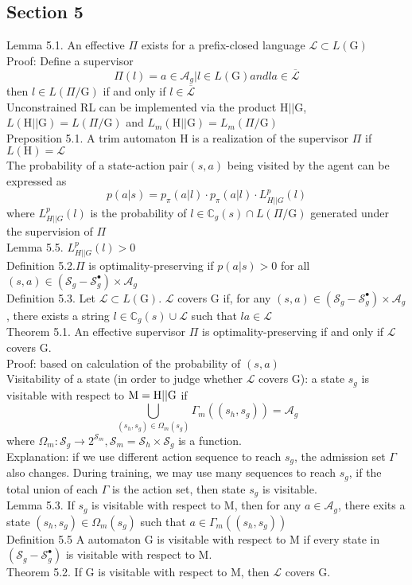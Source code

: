 \documentclass{article}
\begin{document}
\subsection{Section 5}
Lemma 5.1. An effective $\Pi$ exists for a prefix-closed language $\mathcal{L}\subset L(\mathrm{G})$\\
Proof:
Define a supervisor 
$$\Pi(l)=a\in\mathcal{A}_g|l\in L(\mathrm{G}) {and} la\in\overline{\mathcal{L}}$$
then $l\in L(\Pi/\mathrm{G})$ if and only if $l\in\overline{\mathcal{L}}$\\
Unconstrained RL can be implemented via the product $\mathrm{H}||\mathrm{G}$, $L(\mathrm{H}||\mathrm{G})=L(\Pi/\mathrm{G})$ and $L_m(\mathrm{H}||\mathrm{G})=L_m(\Pi/\mathrm{G})$ \\
Preposition 5.1. A trim automaton H is a realization of the supervisor $\Pi$ if $L(\mathrm{H}) = \mathcal{L}$\\
The probability of a state-action pair$(s,a)$ being visited by the agent can be expressed as
$$
p(a|s)=p_{\pi}(a|l)\cdot p_{\pi}(a|l)\cdot L_{{H||G}}^{p}(l)
$$
where $L_{{H||G}}^{p}(l)$ is the probability of $l\in\mathbb{C}_g(s)\cap L(\Pi/\mathrm{G})$ generated under the supervision of $\Pi$\\
Lemma 5.5. $L_{{H||G}}^{p}(l)>0$\\
Definition 5.2.$\Pi$ is optimality-preserving if $p(a|s)>0$ for all $(s,a)\in(\mathcal{S}_g-\mathcal{S}_g^{\bullet})\times \mathcal{A}_g$\\
Definition 5.3. Let $\mathcal{L} \subset L(\mathrm{G})$. $\mathcal{L}$ covers G if, for any $(s,a)\in(\mathcal{S}_g-\mathcal{S}_g^{\bullet})\times \mathcal{A}_g$, there exists a string $l\in \mathbb{C}_g(s)\cup \mathcal{L}$ such that $la\in \mathcal{L}$\\
Theorem 5.1. An effective supervisor $\Pi$ is optimality-preserving if and only if $\mathcal{L}$ covers G.\\
Proof: based on calculation of the probability of $(s,a)$\\
Visitability of a state (in order to judge whether $\mathcal{L}$ covers $\mathrm{G}$): a state $s_g$ is visitable with respect to $\rm{} M=H||G$ if
$$
\bigcup_{(s_h,s_g)\in\Omega_m(s_g)}\Gamma_m((s_h,s_g))=\mathcal{A}_g
$$
where $\Omega_m:\mathcal{S}_g \rightarrow 2^{\mathcal{S}_m}, \mathcal{S}_m=\mathcal{S}_h \times \mathcal{S}_g$ is a function. \\
Explanation: if we use different action sequence to reach $s_g$, the admission set $\Gamma$ also changes. During training, we may use many sequences to reach $s_g$, if the total union of each $\Gamma$ is the action set, then state $s_g$ is visitable.\\
Lemma 5.3. If $s_g$ is visitable with respect to M, then for any $a\in\mathcal{A}_g$, there exits a state $(s_h,s_g) \in \Omega_{m}(s_g)$ such that $a\in \Gamma_m((s_h,s_g))$\\
Definition 5.5 A automaton G is visitable with respect to M if every state in $(\mathcal{S}_g-\mathcal{S}_g^{\bullet})$ is visitable with respect to M.\\
Theorem 5.2. If G is visitable with respect to M, then $\mathcal{L}$ covers G.\\
\end{document}
